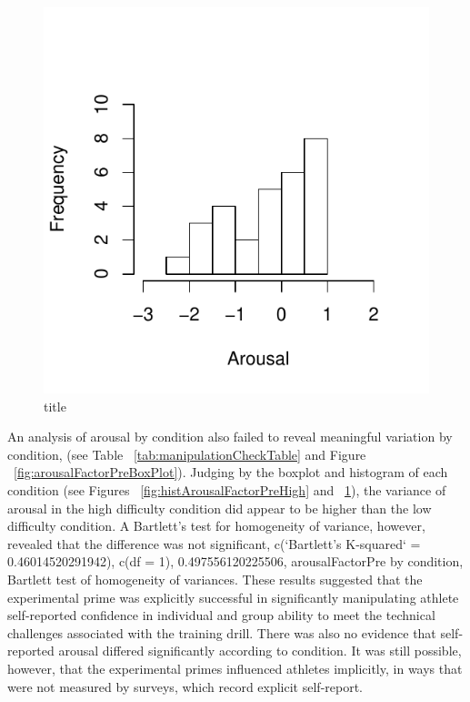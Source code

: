 \begin{figure}
  \centering
  \includegraphics{images/histArousalFactorPreLow-1}
  \caption{title}
    \label{fig:histArousalFactorPreLow}
\end{figure}




An analysis of arousal by condition also failed to reveal meaningful variation by condition, (see Table ~\ref{tab:manipulationCheckTable} and Figure ~\ref{fig:arousalFactorPreBoxPlot}). Judging by the boxplot and histogram of each condition (see Figures ~\ref{fig:histArousalFactorPreHigh} and ~\ref{fig:histArousalFactorPreLow}), the variance of arousal in the high difficulty condition did appear to be higher than the low difficulty condition. A Bartlett's test for homogeneity of variance, however, revealed that the difference was not significant, c(`Bartlett's K-squared` = 0.46014520291942), c(df = 1), 0.497556120225506, arousalFactorPre by condition, Bartlett test of homogeneity of variances.  These results suggested that the experimental prime was explicitly successful in significantly manipulating athlete self-reported confidence in individual and group ability to meet the technical challenges associated with the training drill.  There was also no evidence that self-reported arousal differed significantly according to condition. It was still possible, however, that the experimental primes influenced athletes implicitly, in ways that were not measured by surveys, which record explicit self-report.

